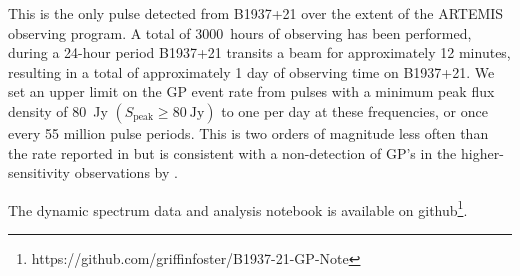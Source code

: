 \documentclass[RNAAS]{aastex62}
\begin{document}
This is the only pulse detected from B1937+21 over the extent of the ARTEMIS
observing program. A total of 3000~hours of observing has been performed, during
a 24-hour period B1937+21 transits a beam for approximately 12 minutes,
resulting in a total of approximately 1 day of observing time on B1937+21. We
set an upper limit on the GP event rate from pulses with a minimum peak flux
density of 80~Jy $(S_{\textrm{peak}} \geq 80~\textrm{Jy})$ to one per day at
these frequencies, or once every 55 million pulse periods. This is two orders of
magnitude less often than the rate reported in \cite{2002AstL...28...21K} but is
consistent with a non-detection of GP's in the higher-sensitivity observations
by \cite{2016A&A...585A.128K}.

The dynamic spectrum data and analysis notebook is available on
github\footnote{https://github.com/griffinfoster/B1937-21-GP-Note}.



\end{document}
